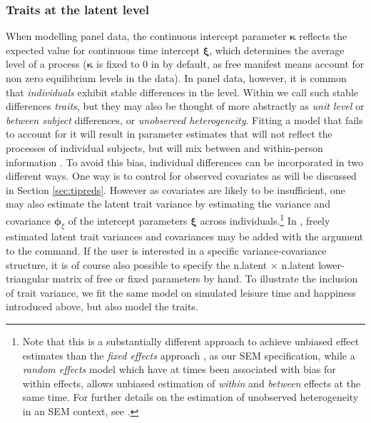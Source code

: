 \documentclass[nojss]{jss}\usepackage[]{graphicx}\usepackage[]{color}
\begin{document}
\subsubsection{Traits at the latent level} \label{sec:heterogeneity} \nopagebreak
When modelling panel data, the continuous intercept parameter $\boldsymbol{\kappa}$ reflects the expected value for continuous time intercept $\boldsymbol{\xi}$, which determines the average level of a process ($\boldsymbol{\kappa}$ is fixed to 0 in  by default, as free manifest means account for non zero equilibrium levels in the data). In panel data, however, it is common that \textit{individuals} exhibit stable differences in the level. Within  we call such stable differences \textit{traits}, but they may also be thought of more abstractly as \textit{unit level} or \textit{between subject} differences, or \textit{unobserved heterogeneity}. Fitting a model that fails to account for it will result in parameter estimates that will not reflect the processes of individual subjects, but will mix between and within-person information \citep{balestra1966pooling, oud2000continuous, halaby2004panel}. 
To avoid this bias, individual differences can be incorporated in two different ways. One way is to control for observed covariates as will be discussed in Section \ref{sec:tipreds}. However as covariates are likely to be insufficient, one may also estimate the latent trait variance by estimating the variance and covariance $\boldsymbol{\phi}_{\xi}$ of the intercept parameters $\boldsymbol{\xi}$ across individuals.\footnote{Note that this is a substantially different approach to achieve unbiased effect estimates than the \textit{fixed effects} approach \citep[see for example][]{mundlak1978pooling}, as our SEM specification, while a \textit{random effects} model which have at times been associated with bias for within effects, allows unbiased estimation of \textit{within} and \textit{between} effects at the same time. For further details on the estimation of unobserved heterogeneity in an SEM context, see \citet{bollen2010general}.} In , freely estimated latent trait variances and covariances may be added with the argument  to the  command. If the user is interested in a specific variance-covariance structure, it is of course also possible to specify the n.latent $\times$ n.latent lower-triangular matrix of free or fixed parameters by hand. To illustrate the inclusion of trait variance, we fit the same model on simulated leisure time and happiness introduced above, but also model the traits. 
\end{document}
